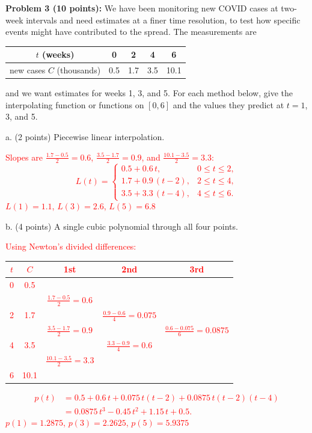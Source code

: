 \documentclass[11pt]{article}
\begin{document}
\vspace{0.5em}
{\bf Problem 3 (10 points):} We have been monitoring new COVID cases at two-week intervals
and need estimates at a finer time resolution, to test how specific events might have
contributed to the spread. The measurements are
\begin{center}
\begin{tabular}{|c|c|c|c|c|} \hline
$t$ (weeks) & 0 & 2 & 4 & 6\\ \hline
new cases $C$ (thousands) & 0.5 & 1.7 & 3.5 & 10.1\\ \hline
\end{tabular}
\end{center}
and we want estimates for weeks 1, 3, and 5. For each method below, give the interpolating
function or functions on $[0,6]$ and the values they predict at $t=1$, 3, and 5.

a. (2 points) Piecewise linear interpolation.

\textcolor{red}{
Slopes are $\tfrac{1.7-0.5}{2} = 0.6$, $\tfrac{3.5-1.7}{2} = 0.9$, and $\tfrac{10.1-3.5}{2} = 3.3$:
\[
L(t) = \begin{cases}
0.5 + 0.6\,t, & 0 \le t \le 2, \\
1.7 + 0.9\,(t-2), & 2 \le t \le 4, \\
3.5 + 3.3\,(t-4), & 4 \le t \le 6.
\end{cases}
\]
$L(1) = 1.1$, $L(3) = 2.6$, $L(5) = 6.8$
}

b. (4 points) A single cubic polynomial through all four points.

\textcolor{red}{
Using Newton's divided differences:
\begin{center}
\begin{tabular}{ccccc}
$t$ & $C$ & 1st & 2nd & 3rd \\ \hline
0 & 0.5 & & & \\
  &     & $\tfrac{1.7-0.5}{2} = 0.6$ & & \\
2 & 1.7 & & $\tfrac{0.9-0.6}{4} = 0.075$ & \\
  &     & $\tfrac{3.5-1.7}{2} = 0.9$ & & $\tfrac{0.6-0.075}{6} = 0.0875$ \\
4 & 3.5 & & $\tfrac{3.3-0.9}{4} = 0.6$ & \\
  &     & $\tfrac{10.1-3.5}{2} = 3.3$ & & \\
6 & 10.1 & & &
\end{tabular}
\end{center}
\begin{align*}
p(t) &= 0.5 + 0.6\,t + 0.075\,t(t-2) + 0.0875\,t(t-2)(t-4) \\
     &= 0.0875\,t^3 - 0.45\,t^2 + 1.15\,t + 0.5.
\end{align*}
$p(1) = 1.2875$, $p(3) = 2.2625$, $p(5) = 5.9375$
}
\end{document}
